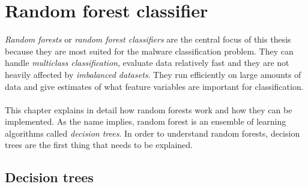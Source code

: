 \documentclass[11pt]{article}
\begin{document}
  \newpage
  \section{Random forest classifier}
    {\it Random forests} or {\it random forest classifiers} are the central focus of this thesis because they are most suited for the malware classification problem. They can handle {\it multiclass classification}, evaluate data relatively fast and they are not heavily affected by {\it imbalanced datasets}.\cite{brabec} They run efficiently on large amounts of data and give estimates of what feature variables are important for classification.\cite{breiman}
    \\~\\
    This chapter explains in detail how random forests work and how they can be implemented. As the name implies, random forest is an ensemble of learning algorithms called {\it decision trees}. In order to understand random forests, decision trees are the first thing that needs to be explained.
    \subsection{Decision trees}
\end{document}
